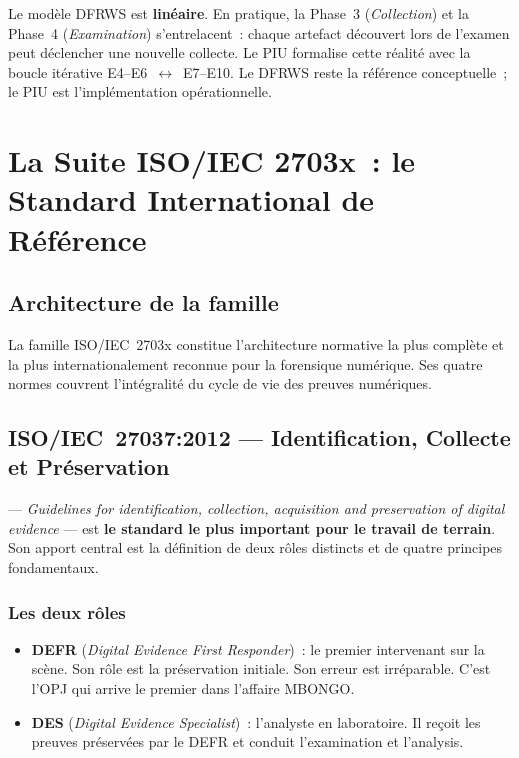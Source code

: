 Le modèle DFRWS est \textbf{linéaire}. En pratique, la Phase~3
(\textit{Collection}) et la Phase~4 (\textit{Examination}) s'entrelacent~:
chaque artefact découvert lors de l'examen peut déclencher une nouvelle
collecte. Le PIU formalise cette réalité avec la boucle itérative
E4--E6~$\leftrightarrow$~E7--E10. Le DFRWS reste la référence conceptuelle~;
le PIU est l'implémentation opérationnelle.

\section{La Suite ISO/IEC 2703x~: le Standard International de Référence}
\label{sec:iso-2703x}

\subsection{Architecture de la famille}

La famille ISO/IEC~2703x constitue l'architecture normative la plus complète
et la plus internationalement reconnue pour la forensique numérique. Ses
quatre normes couvrent l'intégralité du cycle de vie des preuves numériques.

\subsection{ISO/IEC~27037:2012 --- Identification, Collecte et Préservation}

 --- \textit{Guidelines for identification,
collection, acquisition and preservation of digital evidence} ---
est \textbf{le standard le plus important pour le travail de terrain}.
Son apport central est la définition de deux rôles distincts et de quatre
principes fondamentaux.

\subsubsection*{Les deux rôles}

\begin{itemize}
    \item \textbf{DEFR} (\textit{Digital Evidence First Responder})~:
          le premier intervenant sur la scène. Son rôle est la préservation
          initiale. Son erreur est irréparable. C'est l'OPJ qui arrive le
          premier dans l'affaire MBONGO.
    \item \textbf{DES} (\textit{Digital Evidence Specialist})~:
          l'analyste en laboratoire. Il reçoit les preuves préservées par
          le DEFR et conduit l'examination et l'analysis.
\end{itemize}


